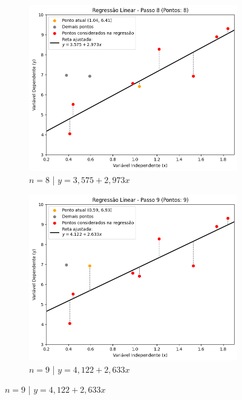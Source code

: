 \begin{figure}[H]
\begin{subfigure}{0.4\textwidth}
	\end{subfigure}
	\label{fig:mqo_7}
	\begin{subfigure}{0.4\textwidth} 
		\includegraphics[width=\linewidth]{figuras/RL_step_8.png}
		\caption{$n = 8$ | $y = 3,575 + 2,973x$}
		\label{fig:intervalo_aplicacao_rls}
	\end{subfigure}
	\label{fig:mqo_8}
	\begin{subfigure}{0.4\textwidth} 
		\includegraphics[width=\linewidth]{figuras/RL_step_9.png}
		\caption{$n = 9$ | $y = 4,122 + 2,633x$}
		\label{fig:intervalo_aplicacao_rls}
	\end{subfigure}
	\label{fig:mqo_9}
\end{figure}

